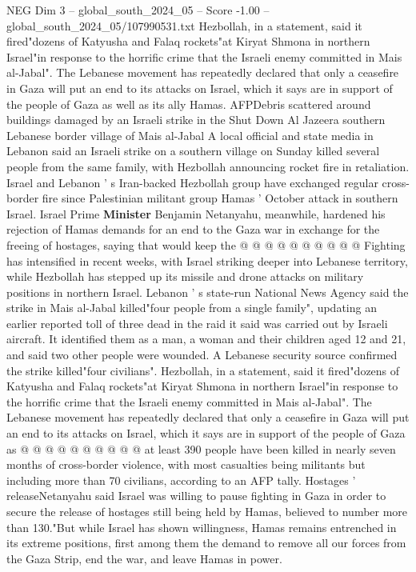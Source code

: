 \begin{textsample}{NEG Dim 3 – global\_south\_2024\_05 – Score -1.00 – global\_south\_2024\_05/107990531.txt}  \label{ex:f3_neg_363}
Hezbollah, in a statement, said it fired"dozens of Katyusha and Falaq rockets"at Kiryat Shmona in northern Israel"in response to the horrific crime that the Israeli enemy committed in Mais al-Jabal".
The Lebanese movement has repeatedly declared that only a ceasefire in Gaza will put an end to its attacks on Israel, which it says are in support of the people of Gaza as well as its ally Hamas.
AFPDebris scattered around buildings damaged by an Israeli strike in the Shut Down Al Jazeera southern Lebanese border village of Mais al-Jabal A local official and state media in Lebanon said an Israeli strike on a southern village on Sunday killed several people from the same family, with Hezbollah announcing rocket fire in retaliation.
Israel and Lebanon ' s Iran-backed Hezbollah group have exchanged regular cross-border fire since Palestinian militant group Hamas ' October attack in southern Israel.
Israel Prime \textbf{Minister} Benjamin Netanyahu, meanwhile, hardened his rejection of Hamas demands for an end to the Gaza war in exchange for the freeing of hostages, saying that would keep the @ @ @ @ @ @ @ @ @ @ Fighting has intensified in recent weeks, with Israel striking deeper into Lebanese territory, while Hezbollah has stepped up its missile and drone attacks on military positions in northern Israel.
Lebanon ' s state-run National News Agency said the strike in Mais al-Jabal killed"four people from a single family", updating an earlier reported toll of three dead in the raid it said was carried out by Israeli aircraft.
It identified them as a man, a woman and their children aged 12 and 21, and said two other people were wounded.
A Lebanese security source confirmed the strike killed"four civilians".
Hezbollah, in a statement, said it fired"dozens of Katyusha and Falaq rockets"at Kiryat Shmona in northern Israel"in response to the horrific crime that the Israeli enemy committed in Mais al-Jabal".
The Lebanese movement has repeatedly declared that only a ceasefire in Gaza will put an end to its attacks on Israel, which it says are in support of the people of Gaza as @ @ @ @ @ @ @ @ @ @ at least 390 people have been killed in nearly seven months of cross-border violence, with most casualties being militants but including more than 70 civilians, according to an AFP tally.
Hostages ' releaseNetanyahu said Israel was willing to pause fighting in Gaza in order to secure the release of hostages still being held by Hamas, believed to number more than 130."But while Israel has shown willingness, Hamas remains entrenched in its extreme positions, first among them the demand to remove all our forces from the Gaza Strip, end the war, and leave Hamas in power.

\end{textsample}
